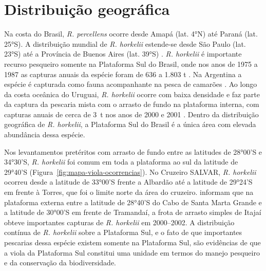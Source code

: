 \documentclass[a4paper,11pt,twoside,showtrims,onecolumn,openright,final]{memoir}
\begin{document}

\section*{Distribuição geográfica}

Na costa do Brasil, \emph{R. percellens} ocorre desde Amapá (lat. 4°N) até Paraná (lat. 25°S). 
A distribuição mundial de \emph{R. horkelii} estende-se desde São Paulo (lat. 23°S) até a 
Província de Buenos Aires (lat. 39°S) \citep{menni2000}. %
\emph{R. horkelii} é importante recurso pesqueiro somente na Plataforma Sul do Brasil, 
onde nos anos de 1975 a 1987 as capturas anuais da espécie foram 
de 636 a 1.803 t \citep{miranda2003}. %
Na Argentina a espécie é capturada como fauna acompanhante na pesca de camarões \citep{menni2000}. %
Ao longo da costa oceânica do Uruguai, \emph{R. horkelii} ocorre com baixa densidade e faz parte 
da captura da pescaria mista com o arrasto de fundo na plataforma interna, com capturas 
anuais de cerca de 3~t nos anos de 2000 e 2001 \citep{meneses1999,paesch2003}. %
Dentro da distribuição geográfica de \emph{R. horkelii}, a Plataforma Sul do Brasil é a única 
área com elevada abundância dessa espécie.

Nos levantamentos pretéritos com arrasto de fundo entre as latitudes de 28°00'S e 34°30'S, 
\emph{R. horkelii} foi comum em toda a plataforma ao sul da latitude de 29°40'S (Figura~\ref{fig:mapa-viola-ocorrencias}).
No Cruzeiro SALVAR, \emph{R. horkelii} ocorreu desde a latitude de 33°00'S frente a Albardão 
até a latitude de 29°24'S em frente à Torres, que foi o limite norte da área do cruzeiro. 
\citet{martins2003} informam que na plataforma externa entre a latitude de 28°40'S 
do Cabo de Santa Marta Grande e a latitude de 30°00'S em frente de Tramandaí, 
a frota de arrasto simples de Itajaí obteve importantes 
capturas de \emph{R. horkelii} em 2000--2002. A distribuição contínua de \emph{R. horkelii} 
sobre a Plataforma Sul, e o fato de que importantes pescarias dessa espécie existem somente na Plataforma Sul, 
são evidências de que a viola da Plataforma Sul constitui uma unidade em termos do manejo 
pesqueiro e da conservação da biodiversidade. 

%
%
\end{document}
